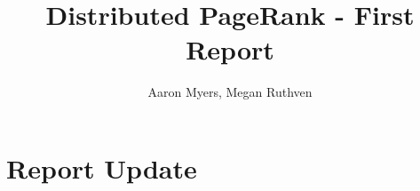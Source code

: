 \documentclass[a4paper,10pt]{article}
\title{Distributed PageRank - First Report}
\author{Aaron Myers, Megan Ruthven}
\begin{document}
\maketitle
\pagebreak
\section{Report Update}
\end{document}
